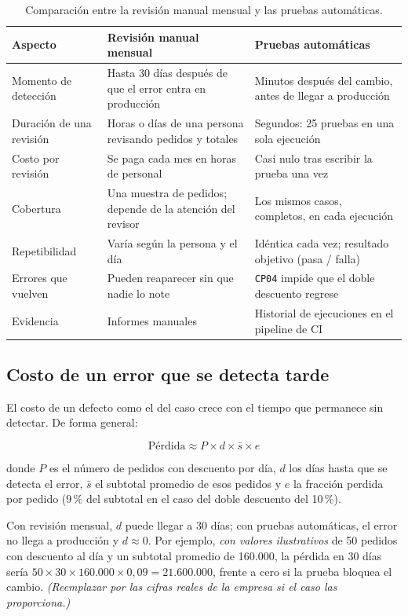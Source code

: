 \documentclass[11pt,a4paper]{article}
\begin{document}
\begin{table}[H]
\centering
\begin{tabularx}{\textwidth}{@{}l L L@{}}
\toprule
\textbf{Aspecto} & \textbf{Revisión manual mensual} & \textbf{Pruebas automáticas}\\
\midrule
Momento de detección & Hasta 30 días después de que el error entra en producción & Minutos después del cambio, antes de llegar a producción\\
Duración de una revisión & Horas o días de una persona revisando pedidos y totales & Segundos: 25 pruebas en una sola ejecución\\
Costo por revisión & Se paga cada mes en horas de personal & Casi nulo tras escribir la prueba una vez\\
Cobertura & Una muestra de pedidos; depende de la atención del revisor & Los mismos casos, completos, en cada ejecución\\
Repetibilidad & Varía según la persona y el día & Idéntica cada vez; resultado objetivo (pasa / falla)\\
Errores que vuelven & Pueden reaparecer sin que nadie lo note & \texttt{CP04} impide que el doble descuento regrese\\
Evidencia & Informes manuales & Historial de ejecuciones en el pipeline de CI\\
\bottomrule
\end{tabularx}
\caption{Comparación entre la revisión manual mensual y las pruebas automáticas.}
\end{table}

\subsection{Costo de un error que se detecta tarde}

El costo de un defecto como el del caso crece con el tiempo que permanece sin detectar. De forma
general:

\[
\text{Pérdida} \approx P \times d \times \bar{s} \times e
\]

donde $P$ es el número de pedidos con descuento por día, $d$ los días hasta que se detecta el error,
$\bar{s}$ el subtotal promedio de esos pedidos y $e$ la fracción perdida por pedido (9\,\% del
subtotal en el caso del doble descuento del 10\,\%).

Con revisión mensual, $d$ puede llegar a 30 días; con pruebas automáticas, el error no llega a
producción y $d \approx 0$. Por ejemplo, \emph{con valores ilustrativos} de 50 pedidos con descuento
al día y un subtotal promedio de 160.000, la pérdida en 30 días sería
$50 \times 30 \times 160.000 \times 0{,}09 = 21.600.000$, frente a cero si la prueba bloquea el cambio.
\textit{(Reemplazar por las cifras reales de la empresa si el caso las proporciona.)}
\end{document}

